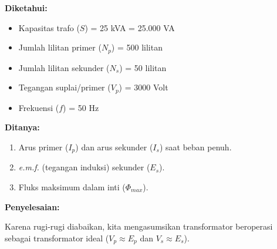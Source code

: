 \documentclass[12pt, a4paper]{article}
\begin{document}
\textbf{Diketahui:}
\begin{itemize}
    \item Kapasitas trafo ($S$) = 25 kVA = 25.000 VA
    \item Jumlah lilitan primer ($N_p$) = 500 lilitan
    \item Jumlah lilitan sekunder ($N_s$) = 50 lilitan
    \item Tegangan suplai/primer ($V_p$) = 3000 Volt
    \item Frekuensi ($f$) = 50 Hz
\end{itemize}

\textbf{Ditanya:}
\begin{enumerate}
    \item Arus primer ($I_p$) dan arus sekunder ($I_s$) saat beban penuh.
    \item \textit{e.m.f.} (tegangan induksi) sekunder ($E_s$).
    \item Fluks maksimum dalam inti ($\Phi_{max}$).
\end{enumerate}

\textbf{Penyelesaian:}

Karena rugi-rugi diabaikan, kita mengasumsikan transformator beroperasi sebagai transformator ideal ($V_p \approx E_p$ dan $V_s \approx E_s$).
\end{document}
